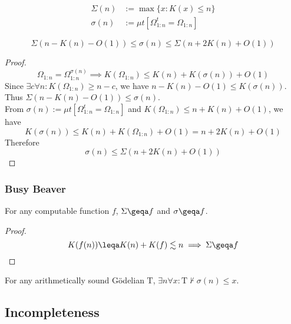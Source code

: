 \documentclass[UTF8,aspectratio=43,11pt,colorlinks,compress,openany]{beamer}%
\begin{document}
\begin{frame}\frametitle{}
\setlength\abovedisplayskip{0pt}
\setlength\belowdisplayskip{0pt}
	\begin{definition}
		\begin{align*}
		\Sigma(n)&:=\max\{x: K(x)\leq n\}\\
		\sigma(n)&:=\mu t\left[\Omega^t_{1:n}=\Omega_{1:n}\right]
		\end{align*}
	\end{definition}
	\begin{lemma}
		\[\Sigma(n-K(n)-O(1))\leq \sigma(n)\leq\Sigma(n+2K(n)+O(1))\]
	\end{lemma}
	\begin{proof}
		\[\Omega_{1:n}=\Omega^{\sigma(n)}_{1:n}\implies K(\Omega_{1:n})\leq K(n)+K(\sigma(n))+O(1)\]
		Since $\exists c\forall n: K(\Omega_{1:n})\geq n-c$, we have $n-K(n)-O(1)\leq K(\sigma(n))$.\\
		Thus $\Sigma(n-K(n)-O(1))\leq \sigma(n)$.\\
		From $\sigma(n):=\mu t\left[\Omega^t_{1:n}=\Omega_{1:n}\right]$ and $K(\Omega_{1:n})\leq n+K(n)+O(1)$, we have \[K(\sigma(n))\leq K(n)+K(\Omega_{1:n})+O(1)=n+2K(n)+O(1)\]
		Therefore
		\[\sigma(n)\leq\Sigma(n+2K(n)+O(1))\]
	\end{proof}
\end{frame}

\begin{frame}\frametitle{Busy Beaver}
	\begin{lemma}
		For any computable function $f$, $\Sigma\geqa f$ and $\sigma\geqa f$.
	\end{lemma}
	\begin{proof}
		\[K(f(n))\leqa K(n)+K(f)\lesssim n\implies
		\Sigma\geqa f\]
	\end{proof}
	\begin{theorem}
		For any arithmetically sound G\"odelian $\mathrm{T}$, $\exists n\forall x:\mathrm{T}\nvdash \sigma(n)\leq x$.
	\end{theorem}
\end{frame}

\subsection{Incompleteness}
\end{document}
